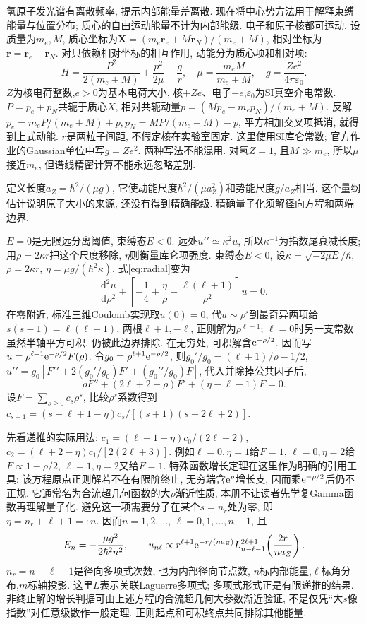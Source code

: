 氢原子发光谱有离散频率, 提示内部能量差离散. 现在将中心势方法用于解释束缚能量与位置分布; 质心的自由运动能量不计为内部能级. 电子和原子核都可运动. 设质量为$m_e,M$, 质心坐标为$\boldsymbol X=(m_e\boldsymbol r_e+M\boldsymbol r_N)/(m_e+M)$, 相对坐标为$\boldsymbol r=\boldsymbol r_e-\boldsymbol r_N$. 对只依赖相对坐标的相互作用, 动能分为质心项和相对项:
\[
H=\frac{P^2}{2(m_e+M)}+\frac{p^2}{2\mu}-\frac{g}{r},
\quad \mu=\frac{m_eM}{m_e+M},\quad g=\frac{Ze^2}{4\pi\varepsilon_0}.
\]
$Z$为核电荷整数,$e>0$为基本电荷大小, 核$+Ze$、电子$-e$,$\varepsilon_0$为SI真空介电常数. $P=p_e+p_N$共轭于质心$X$, 相对共轭动量$p=(Mp_e-m_ep_N)/(m_e+M)$. 反解$p_e=m_eP/(m_e+M)+p,p_N=MP/(m_e+M)-p$, 平方相加交叉项抵消, 就得到上式动能. $r$是两粒子间距, 不假定核在实验室固定. 这里使用SI库仑常数; 官方作业的Gaussian单位中写$g=Ze^2$. 两种写法不能混用. 对氢$Z=1$, 且$M\gg m_e$, 所以$\mu$接近$m_e$, 但谱线精密计算不能永远忽略差别.

定义长度$a_Z=\hbar^2/(\mu g)$, 它使动能尺度$\hbar^2/(\mu a_Z^2)$和势能尺度$g/a_Z$相当. 这个量纲估计说明原子大小的来源, 还没有得到精确能级. 精确量子化须解径向方程和两端边界.

$E=0$是无限远分离阈值, 束缚态$E<0$. 远处$u\prime\prime\simeq\kappa^2u$, 所以$\kappa^{-1}$为指数尾衰减长度; 用$\rho=2\kappa r$把这个尺度移除, $\eta$则衡量库仑项强度. 束缚态$E<0$, 设$\kappa=\sqrt{-2\mu E}/\hbar$, $\rho=2\kappa r$, $\eta=\mu g/(\hbar^2\kappa)$. 式\eqref{eq:radial}变为
\[
\frac{\mathrm d^2u}{\mathrm d\rho^2}
+\left[-\frac14+\frac\eta\rho-\frac{\ell(\ell+1)}{\rho^2}\right]u=0.
\]
在零附近, 标准三维Coulomb实现取$u(0)=0$, 代$u\sim\rho^s$到最奇异两项给$s(s-1)=\ell(\ell+1)$, 两根$\ell+1,-\ell$, 正则解为$\rho^{\ell+1}$; $\ell=0$时另一支常数虽然半轴平方可积, 仍被此边界排除. 在无穷处, 可积解含$\mathrm e^{-\rho/2}$. 因而写$u=\rho^{\ell+1}\mathrm e^{-\rho/2}F(\rho)$. 令$g_0=\rho^{\ell+1}\mathrm e^{-\rho/2}$, 则$g_0\prime/g_0=(\ell+1)/\rho-1/2$, $u\prime\prime=g_0[F\prime\prime+2(g_0\prime/g_0)F\prime+(g_0\prime\prime/g_0)F]$, 代入并除掉公共因子后,
\[
\rho F''+(2\ell+2-\rho)F'+(\eta-\ell-1)F=0.
\]
设$F=\sum_{s\ge0}c_s\rho^s$, 比较$\rho^s$系数得到
$c_{s+1}=(s+\ell+1-\eta)c_s/[(s+1)(s+2\ell+2)]$.

先看递推的实际用法: $c_1=(\ell+1-\eta)c_0/(2\ell+2)$, $c_2=(\ell+2-\eta)c_1/[2(2\ell+3)]$. 例如$\ell=0,\eta=1$给$F=1$, $\ell=0,\eta=2$给$F\propto1-\rho/2$, $\ell=1,\eta=2$又给$F=1$. 特殊函数增长定理在这里作为明确的引用工具: 该方程原点正则解若不在有限阶终止, 无穷端含$\mathrm e^\rho$增长支, 因而乘$\mathrm e^{-\rho/2}$后仍不正规. 它通常名为合流超几何函数的大$\rho$渐近性质, 本册不让读者先学复Gamma函数再理解量子化. 避免这一项需要分子在某个$s=n_r$处为零, 即$\eta=n_r+\ell+1=:n$. 因而$n=1,2,\ldots$, $\ell=0,1,\ldots,n-1$, 且
\[
E_n=-\frac{\mu g^2}{2\hbar^2n^2},\qquad
u_{n\ell}\propto r^{\ell+1}\mathrm e^{-r/(na_Z)}
L_{n-\ell-1}^{2\ell+1}\!\left(\frac{2r}{na_Z}\right).
\]
$n_r=n-\ell-1$是径向多项式次数, 也为内部径向节点数, $n$标内部能量,$\ell$标角分布,$m$标轴投影. 这里$L$表示关联Laguerre多项式; 多项式形式正是有限递推的结果. 非终止解的增长判据可由上述方程的合流超几何大参数渐近验证, 不是仅凭“大$s$像指数”对任意级数作一般定理. 正则起点和可积终点共同排除其他能量.

